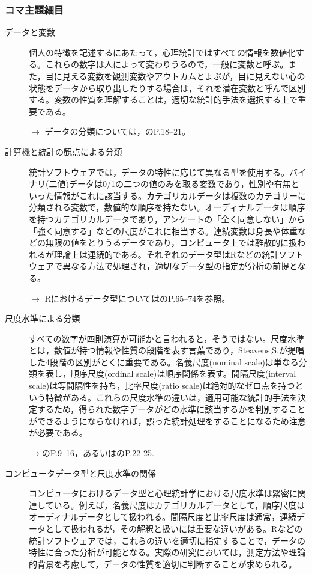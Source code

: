 \subsubsection{コマ主題細目}
\begin{description}
	\item[データと変数] 個人の特徴を記述するにあたって，心理統計ではすべての情報を数値化する。これらの数字は人によって変わりうるので，一般に変数と呼ぶ。また，目に見える変数を観測変数やアウトカムとよぶが，目に見えない心の状態をデータから取り出したりする場合は，それを潜在変数と呼んで区別する。変数の性質を理解することは，適切な統計的手法を選択する上で重要である。
	      \begin{flushright}
		      $\to$ データの分類については，\textcite{Yamada2004}のP.18--21。
	      \end{flushright}

	\item[計算機と統計の観点による分類] 統計ソフトウェアでは，データの特性に応じて異なる型を使用する。バイナリ(二値)データは0/1の二つの値のみを取る変数であり，性別や有無といった情報がこれに該当する。カテゴリカルデータは複数のカテゴリーに分類される変数で，数値的な順序を持たない。オーディナルデータは順序を持つカテゴリカルデータであり，アンケートの「全く同意しない」から「強く同意する」などの尺度がこれに相当する。連続変数は身長や体重などの無限の値をとりうるデータであり，コンピュータ上では離散的に扱われるが理論上は連続的である。それぞれのデータ型はRなどの統計ソフトウェアで異なる方法で処理され，適切なデータ型の指定が分析の前提となる。
	      \begin{flushright}
		      $\to$ Rにおけるデータ型については\textcite{Baba2020}のP.65--74を参照。
	      \end{flushright}

	\item[尺度水準による分類] すべての数字が四則演算が可能かと言われると，そうではない。尺度水準とは，数値が持つ情報や性質の段階を表す言葉であり，Steavens,S.が提唱した4段階の区別がとくに重要である。名義尺度(nominal scale)は単なる分類を表し，順序尺度(ordinal scale)は順序関係を表す。間隔尺度(interval scale)は等間隔性を持ち，比率尺度(ratio scale)は絶対的なゼロ点を持つという特徴がある。これらの尺度水準の違いは，適用可能な統計的手法を決定するため，得られた数字データがどの水準に該当するかを判別することができるようにならなければ，誤った統計処理をすることになるため注意が必要である。
	      \begin{flushright}
		      $\to$\textcite{Kawabata201408}のP.9--16，あるいは\textcite{Yamada2004}のP.22-25.
	      \end{flushright}

	\item[コンピュータデータ型と尺度水準の関係] コンピュータにおけるデータ型と心理統計学における尺度水準は緊密に関連している。例えば，名義尺度はカテゴリカルデータとして，順序尺度はオーディナルデータとして扱われる。間隔尺度と比率尺度は通常，連続データとして扱われるが，その解釈と扱いには重要な違いがある。Rなどの統計ソフトウェアでは，これらの違いを適切に指定することで，データの特性に合った分析が可能となる。実際の研究においては，測定方法や理論的背景を考慮して，データの性質を適切に判断することが求められる。

\end{description}

